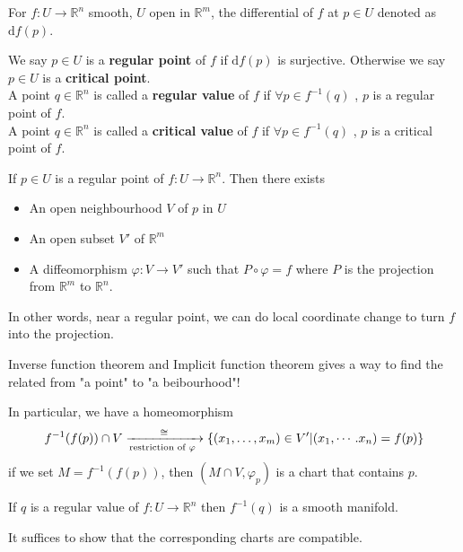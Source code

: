 For  $ f:U\rightarrow \mathbb{R}^n $ smooth,  $ U  $ open in  $ \mathbb{R}^m $,  the differential of  $ f  $ at  $ p\in U  $ denoted as  $ \mathrm{d}f(p) $.  
\begin{definition}
    We say  $ p\in U  $ is a \textbf{regular point} of  $ f  $ if  $ \mathrm{d}f(p)  $ is surjective. Otherwise we say  $ p\in U  $ is a \textbf{critical point}.\\
    A point  $ q\in \mathbb{R}^n  $ is called a \textbf{regular value} of  $ f  $ if  $ \forall  p\in f^{-1}(q)  $ ,  $ p  $ is a regular point of  $ f $.\\
    A point  $ q\in \mathbb{R}^n  $ is called a \textbf{critical value} of  $ f  $ if  $ \forall  p\in f^{-1}(q)  $ ,  $ p  $ is a critical point of  $ f $.
\end{definition}
\begin{theorem}
    If  $ p\in U  $ is a regular point of  $ f:U\rightarrow \mathbb{R}^n  $. Then there exists 
    \begin{itemize}
        \item An open neighbourhood  $ V  $ of  $ p  $ in  $ U  $
        \item An open subset  $ V'  $ of  $ \mathbb{R}^m $
        \item  A diffeomorphism  $ \varphi:V\rightarrow V'  $ such that  $ P\circ \varphi=f $ where  $ P  $ is the projection from  $ \mathbb{R}^m $ to  $ \mathbb{R}^n $. 
    \end{itemize}
    In other words, near a regular point, we can do local coordinate change to turn  $ f  $ into the projection.
\end{theorem}
\begin{remark}
    Inverse function theorem and Implicit function theorem gives a way to find the related from "a point" to "a beibourhood"!
    
    In particular, we have a homeomorphism
    \[ f^{-1}(f(p))\cap V \xrightarrow[\text{restriction of  $ \varphi $ }]{\cong }\{(x_1,\dots,x_m)\in V'|(x_1,\cdots.x_n)=f(p)\}\]
    \ie if we set  $ M=f^{-1}(f(p)) $, then  $ (M\cap V,\varphi_p) $ is a chart that contains  $ p  $.  
\end{remark}
\begin{corollary}
    If  $ q  $ is a regular value of  $ f:U\rightarrow \mathbb{R}^n $ then  $ f^{-1}(q) $ is a smooth manifold.
\end{corollary}
\begin{remark}
    It suffices to show that the corresponding charts are compatible.
\end{remark}
